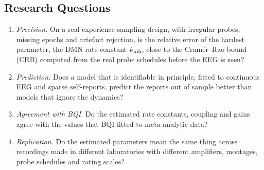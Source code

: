 \subsection{Research Questions}
\begin{enumerate}
  \item[RQ1] \emph{Precision.} On a real experience-sampling design, with irregular probes, missing epochs and artefact rejection, is the relative error of the hardest parameter, the DMN rate constant $k_{\mathrm{inh}}$, close to the Cram\'er--Rao bound (CRB) computed from the real probe schedules before the EEG is seen?
  \item[RQ2] \emph{Prediction.} Does a model that is identifiable in principle, fitted to continuous EEG and sparse self-reports, predict the reports out of sample better than models that ignore the dynamics?
  \item[RQ3] \emph{Agreement with BQI.} Do the estimated rate constants, coupling and gains agree with the values that BQI fitted to meta-analytic data?
  \item[RQ4] \emph{Replication.} Do the estimated parameters mean the same thing across recordings made in different laboratories with different amplifiers, montages, probe schedules and rating scales?
\end{enumerate}

